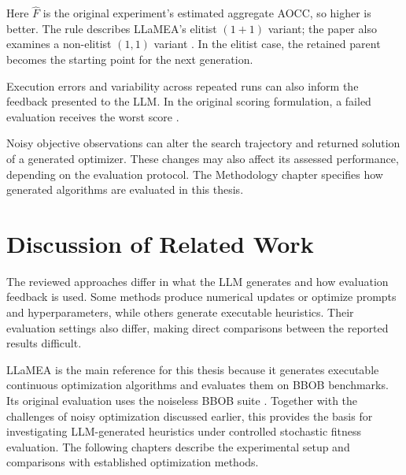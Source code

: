 Here $\widehat{F}$ is the original experiment's estimated aggregate AOCC,
so higher is better. The rule describes LLaMEA's elitist $(1+1)$ variant;
the paper also examines a non-elitist $(1,1)$ variant \cite{LLaMEA2024}.
In the elitist case, the retained parent becomes the starting point for the
next generation.

Execution errors and variability across repeated runs can also inform the
feedback presented to the LLM. In the original scoring formulation, a failed
evaluation receives the worst score \cite{LLaMEA2024}.

Noisy objective observations can alter the search trajectory
and returned solution of a generated optimizer. These changes
may also affect its assessed performance, depending on the
evaluation protocol. The Methodology chapter specifies how
generated algorithms are evaluated in this thesis.

\section{Discussion of Related Work}
\label{sec:related_work_discussion}

The reviewed approaches differ in what the LLM generates and
how evaluation feedback is used. Some methods produce numerical
updates or optimize prompts and hyperparameters, while others
generate executable heuristics. Their evaluation settings also
differ, making direct comparisons between the reported results
difficult.

LLaMEA is the main reference for this thesis because it generates
executable continuous optimization algorithms and evaluates
them on BBOB benchmarks. Its original evaluation uses the
noiseless BBOB suite \cite{LLaMEA2024}. Together with the
challenges of noisy optimization discussed earlier, this
provides the basis for investigating LLM-generated heuristics
under controlled stochastic fitness evaluation. The following
chapters describe the experimental setup and comparisons with
established optimization methods.
